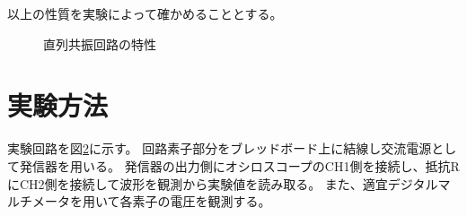 \documentclass[11pt,a4paper,fleqn]{jsarticle}
\begin{document}
以上の性質を実験によって確かめることとする。
\begin{figure}[htbp]
 \centering
 \caption{直列共振回路の特性}
 \label{fig:2}
\end{figure}

%
\section{実験方法}

実験回路を図\ref{fig:3}に示す。
回路素子部分をブレッドボード上に結線し交流電源として発信器を用いる。
発信器の出力側にオシロスコープのCH1側を接続し、抵抗RにCH2側を接続して波形を観測から実験値を読み取る。
また、適宜デジタルマルチメータを用いて各素子の電圧を観測する。
\begin{figure}[h]
\label{fig:3}
\end{figure}
\end{document}
